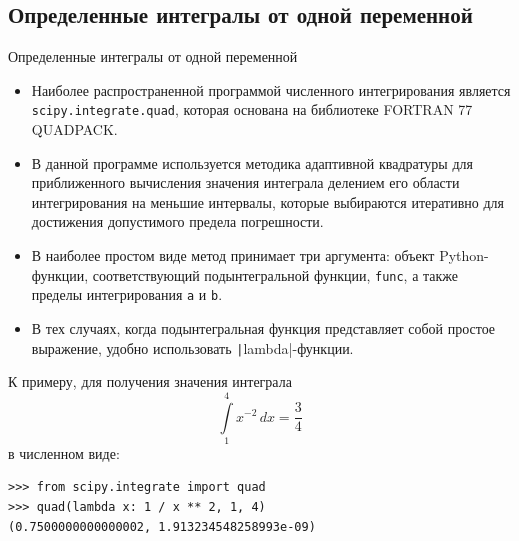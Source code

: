 \documentclass[aspectratio=169, mathserif]{beamer}	%
\begin{document}
\subsection{Определенные интегралы от одной переменной}
\begin{frame}[fragile, label=c]{Определенные интегралы от одной переменной}
\scriptsize
\begin{itemize}
	\item Наиболее распространенной программой численного интегрирования является \linebreak \texttt{scipy.integrate.quad}, которая основана на библиотеке FORTRAN 77 QUADPACK.
	\item В данной программе используется методика адаптивной квадратуры для приближенного вычисления значения интеграла делением его области интегрирования на меньшие интервалы, которые выбираются итеративно для достижения допустимого предела погрешности.
	\item В наиболее простом виде метод принимает  три аргумента: объект Python-функции, соответствующий подынтегральной функции, \texttt{func}, а также пределы интегрирования \texttt{a} и \texttt{b}.
	\item В тех случаях, когда подынтегральная функция представляет собой простое выражение, удобно использовать \texttt|lambda|-функции.
\end{itemize}
К примеру, для получения значения интеграла
\vfill
$$
	\int\limits_{1}^{4} x^{-2} \, dx = \dfrac{3}{4}
$$
\vfill
\noindent в численном виде:
\vfill
\begin{verbatim}
>>> from scipy.integrate import quad
>>> quad(lambda x: 1 / x ** 2, 1, 4)
(0.7500000000000002, 1.913234548258993e-09)
\end{verbatim}
\vfill
\end{frame}
\end{document}

